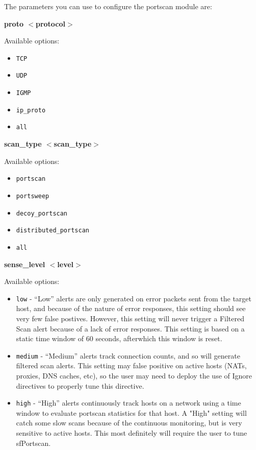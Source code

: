 \documentclass[english]{report}
\newcounter{slistnum}
\newenvironment{slist}
{ \begin{list}{ {\bf \arabic{slistnum}.} }{\usecounter{slistnum} } }
{ \end{list} }
\begin{document}
The parameters you can use to configure the portscan module are:

\begin{slist}
\item \textbf{proto $<$protocol$>$}

Available options:

\begin{itemize}
\item \texttt{TCP}
\item \texttt{UDP}
\item \texttt{IGMP}
\item \texttt{ip\_proto}
\item \texttt{all}
\end{itemize}

\item \textbf{scan\_type $<$scan\_type$>$}

Available options: 

\begin{itemize}
\item \texttt{portscan} 
\item \texttt{portsweep} 
\item \texttt{decoy\_portscan}
\item \texttt{distributed\_portscan}
\item \texttt{all}
\end{itemize}

\item \textbf{sense\_level $<$level$>$}

Available options:

\begin{itemize}

\item \texttt{low} - ``Low'' alerts are only generated on error packets sent
from the target host, and because of the nature of error responses, this
setting should see very few false postives. However, this setting will never
trigger a Filtered Scan alert because of a lack of error responses. This
setting is based on a static time window of 60 seconds, afterwhich this window
is reset.

\item \texttt{medium} - ``Medium'' alerts track connection counts, and so will
generate filtered scan alerts. This setting may false positive on active hosts
(NATs, proxies, DNS caches, etc), so the user may need to deploy the use of
Ignore directives to properly tune this directive.

\item \texttt{high} - ``High'' alerts continuously track hosts on a network
using a time window to evaluate portscan statistics for that host. A "High"
setting will catch some slow scans because of the continuous monitoring, but is
very sensitive to active hosts. This most definitely will require the user to
tune sfPortscan.


\end{itemize}
\end{slist}
\end{document}
